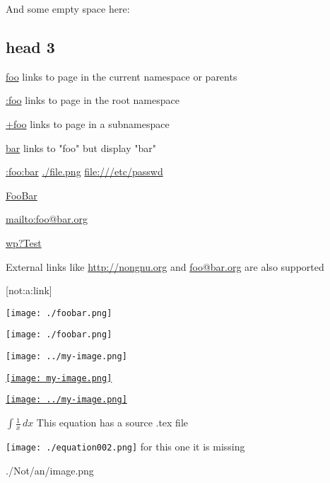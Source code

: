 And some empty space here:







\subsection{head 3}

\href{foo}{foo}  links to page in the current namespace or parents

\href{:foo}{:foo} links to page in the root namespace

\href{+foo}{+foo} links to page in a subnamespace

\href{foo}{bar} links to "foo" but display "bar"



\href{:foo:bar}{:foo:bar} \href{./file.png}{./file.png} \href{file:///etc/passwd}{file:///etc/passwd}

\href{Foo}{Foo}\href{Bar}{Bar}



\href{mailto:foo@bar.org}{mailto:foo@bar.org}

\href{interwiki:wp?Test}{wp?Test}



External links like \href{http://nongnu.org}{http://nongnu.org} and \href{mailto:foo@bar.org}{foo@bar.org} are also supported



[not:a:link]





\texttt{[image: ./foobar.png]}

\texttt{[image: ./foobar.png]}

\texttt{[image: ../my-image.png]}

\href{Foo}{\texttt{[image: my-image.png]}}

\href{:foo:bar}{\texttt{[image: ../my-image.png]}}



\begin{math}
\int \frac{1}{x} \, d x
\end{math} This equation has a source .tex file

\texttt{[image: ./equation002.png]} for this one it is missing



{./Not/an/image.png}



